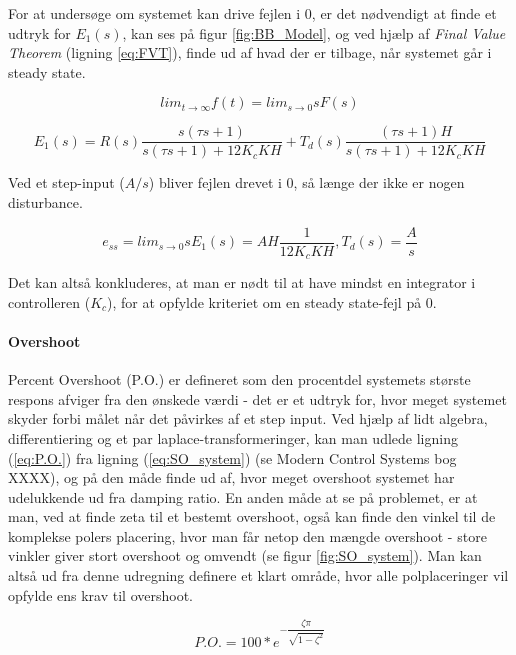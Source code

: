 For at undersøge om systemet kan drive fejlen i 0, er det nødvendigt at finde et udtryk for $E_{1}(s)$, kan ses på figur \ref{fig:BB_Model}, og ved hjælp af \textit{Final Value Theorem} (ligning \ref{eq:FVT}), finde ud af hvad der er tilbage, når systemet går i steady state. 

\begin{equation} \label{eq:FVT}
lim_{t \to \infty} f(t) = lim_{s \to 0} sF(s)
\end{equation}

\begin{equation} \label{eq:ess}
E_{1}(s)=R(s)\frac{s(\tau s+1)}{s(\tau s+1)+12K_{c}KH}+T_{d}(s)\frac{(\tau s+1)H}{s(\tau s+1)+12K_{c}KH}
\end{equation}

Ved et step-input ($A/s$) bliver fejlen drevet i 0, så længe der ikke er nogen disturbance. 

\begin{equation}
e_{ss}=lim_{s \to 0} sE_{1}(s)=AH\frac{1}{12K_{c}KH} , T_{d}(s)=\dfrac{A}{s}
\end{equation}

Det kan altså konkluderes, at man er nødt til at have mindst en integrator i controlleren ($K_{c}$), for at opfylde kriteriet om en steady state-fejl på 0. 

\paragraph{Overshoot}

Percent Overshoot (P.O.) er defineret som den procentdel systemets største respons afviger fra den ønskede værdi - det er et udtryk for, hvor meget systemet skyder forbi målet når det påvirkes af et step input. Ved hjælp af lidt algebra, differentiering og et par laplace-transformeringer, kan man udlede ligning (\ref{eq:P.O.}) fra ligning (\ref{eq:SO_system}) (se Modern Control Systems bog XXXX), og på den måde finde ud af, hvor meget overshoot systemet har udelukkende ud fra damping ratio. En anden måde at se på problemet, er at man, ved at finde zeta til et bestemt overshoot, også kan finde den vinkel til de komplekse polers placering, hvor man får netop den mængde overshoot - store vinkler giver stort overshoot og omvendt (se figur \ref{fig:SO_system}). Man kan altså ud fra denne udregning definere et klart område, hvor alle polplaceringer vil opfylde ens krav til overshoot. 

\begin{equation}\label{eq:P.O.}
P.O.=100*e^{-\dfrac{\zeta\pi}{\sqrt{1-\zeta^2}}}
\end{equation}

